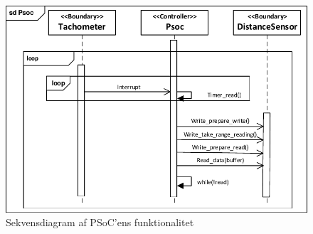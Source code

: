 \begin{figure}[h]
	\centering
	\includegraphics[]{../fig/diagrammer/psoc/sd_psoc.pdf}
	\caption{Sekvensdiagram af PSoC'ens funktionalitet}
	\label{fig:sd_main_psoc}
\end{figure}

\clearpage
